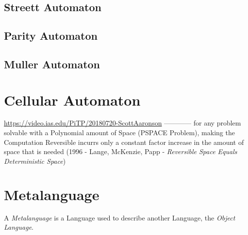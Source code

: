 \subsection{Streett Automaton}\label{sec:streett_automaton}

\subsection{Parity Automaton}\label{sec:parity_automaton}

\subsection{Muller Automaton}\label{sec:muller_automaton}



\section{Cellular Automaton}\label{sec:cellular_automaton}

\url{https://video.ias.edu/PiTP/20180720-ScottAaronson} ------------
for any problem solvable with a Polynomial amount of Space (PSPACE Problem),
making the Computation Reversible incurrs only a constant factor increase in the
amount of space that is needed (1996 - Lange, McKenzie, Papp - \emph{Reversible
  Space Equals Deterministic Space})



\section{Metalanguage}\label{sec:metalanguage}

A \emph{Metalanguage} is a Language used to describe another Language,
the \emph{Object Language}.

